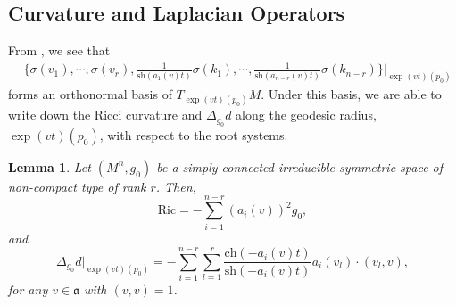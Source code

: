 \documentclass[12pt]{amsart}
\newtheorem{lemma}{Lemma}[section]
\begin{document}
\subsection{Curvature and Laplacian Operators}
From , we see that 
\begin{align*}
    &\bigg\{ \sigma(v_1), \cdots, \sigma(v_r), \frac{1}{\mathrm{sh}(a_1(v) t)}\sigma(k_1), \cdots, \frac{1}{\mathrm{sh}(a_{n - r} (v)t)}\sigma(k_{n - r})\bigg\}\bigg|_{\exp(vt)(p_0)}
\end{align*}
forms an orthonormal basis of $T_{\exp(v t)(p_0)}M$. Under this basis, we are able to write down the Ricci curvature and $\Delta_{g_0} d$ along the geodesic radius, $\exp(v t)(p_0)$, with respect to the root systems.
\begin{lemma}\label{laplacian distance function}
    Let $(M^n, g_0)$ be a simply connected irreducible symmetric space of non-compact type of rank $r$. Then, 
    \begin{equation}\label{laplace distance function ricci}
        \mathrm{Ric} = -\sum_{i = 1}^{n - r} (a_{i}(v))^2 g_0,
    \end{equation}
    and 
    \begin{equation}\label{laplace distance function itself}
        \Delta_{g_0} d|_{\exp(v t)(p_0)} = -\sum_{i = 1}^{n - r}\sum_{l = 1}^{r}\frac{\mathrm{ch}(-a_i(v)t)}{\mathrm{sh}(-a_i(v)t)}a_i(v_{l})\cdot (v_l, v),
    \end{equation}
    for any $v\in \mathfrak{a}$ with $(v, v) = 1$. 
\end{lemma}
\end{document}
